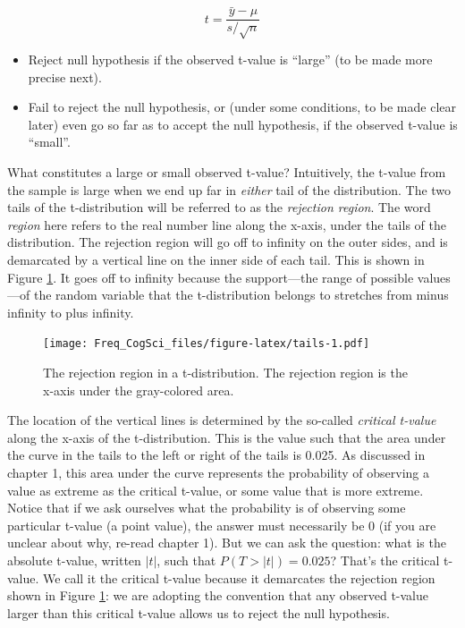 \documentclass[12pt,]{krantz}
\providecommand{\tightlist}{%
  \setlength{\itemsep}{0pt}\setlength{\parskip}{0pt}}
\begin{document}
\begin{equation}
t=\frac{\bar{y}-\mu}{s/\sqrt{n}}
\end{equation}

\begin{itemize}
\tightlist
\item
  Reject null hypothesis if the observed t-value is ``large'' (to be made more precise next).
\item
  Fail to reject the null hypothesis, or (under some conditions, to be made clear later) even go so far as to accept the null hypothesis, if the observed t-value is ``small''.
\end{itemize}

What constitutes a large or small observed t-value?
Intuitively, the t-value from the sample is large when we end up far in \emph{either} tail of the distribution. The two tails of the t-distribution will be referred to as the \emph{rejection region}. The word \emph{region} here refers to the real number line along the x-axis, under the tails of the distribution. The rejection region will go off to infinity on the outer sides, and is demarcated by a vertical line on the inner side of each tail. This is shown in Figure \ref{fig:tails}. It goes off to infinity because the support---the range of possible values---of the random variable that the t-distribution belongs to stretches from minus infinity to plus infinity.

\begin{figure}
\centering
\texttt{[image: Freq\_CogSci\_files/figure-latex/tails-1.pdf]}
\caption{\label{fig:tails}The rejection region in a t-distribution. The rejection region is the x-axis under the gray-colored area.}
\end{figure}

The location of the vertical lines is determined by the so-called \emph{critical t-value} along the x-axis of the t-distribution. This is the value such that the area under the curve in the tails to the left or right of the tails is 0.025. As discussed in chapter 1, this area under the curve represents the probability of observing a value as extreme as the critical t-value, or some value that is more extreme. Notice that if we ask ourselves what the probability is of observing some particular t-value (a point value), the answer must necessarily be \(0\) (if you are unclear about why, re-read chapter 1). But we can ask the question: what is the absolute t-value, written \(|t|\), such that \(P(T>|t|)=0.025\)? That's the critical t-value. We call it the critical t-value because it demarcates the rejection region shown in Figure \ref{fig:tails}: we are adopting the convention that any observed t-value larger than this critical t-value allows us to reject the null hypothesis.
\end{document}
